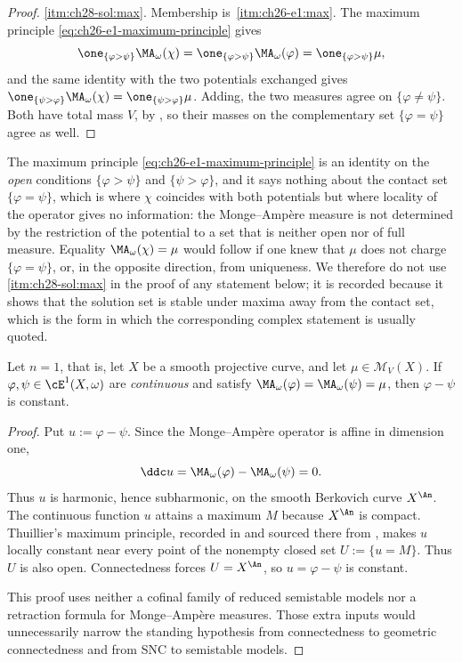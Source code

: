 \begin{proof}
\cref{itm:ch28-sol:max}.  Membership is
\,\cref{itm:ch26-e1:max}.  The maximum principle
\eqref{eq:ch26-e1-maximum-principle} gives
\[
 \one_{\{\varphi>\psi\}}\MA_\omega(\chi)
 =\one_{\{\varphi>\psi\}}\MA_\omega(\varphi)
 =\one_{\{\varphi>\psi\}}\mu ,
\]
and the same identity with the two potentials exchanged gives
$\one_{\{\psi>\varphi\}}\MA_\omega(\chi)
=\one_{\{\psi>\varphi\}}\mu$.  Adding, the two measures agree on
$\{\varphi\neq\psi\}$.  Both have total mass $V$, by
, so their masses on the complementary set
$\{\varphi=\psi\}$ agree as well.
\end{proof}

\begin{remark}
\label{rem:ch28-max-on-contact}
The maximum principle \eqref{eq:ch26-e1-maximum-principle} is an identity on
the \emph{open} conditions $\{\varphi>\psi\}$ and $\{\psi>\varphi\}$, and
it says nothing about the contact set $\{\varphi=\psi\}$, which is where
$\chi$ coincides with both potentials but where locality of the operator
gives no information: the Monge--Amp\`ere measure is not determined by the
restriction of the potential to a set that is neither open nor of full
measure.  Equality $\MA_\omega(\chi)=\mu$ would follow if one knew that
$\mu$ does not charge $\{\varphi=\psi\}$, or, in the opposite direction,
from uniqueness.  We therefore do not use \cref{itm:ch28-sol:max} in the proof
of any statement below; it is recorded because it shows that the solution set
is stable under maxima away from the contact set, which is the form in which
the corresponding complex statement is usually quoted.
\end{remark}

\begin{proposition}
\label{prop:ch28-curve-uniqueness}
Let $n=1$, that is, let $X$ be a smooth projective curve, and let
$\mu\in\mathcal M_V(X)$.  If $\varphi,\psi\in\cE^1(X,\omega)$ are
\emph{continuous} and satisfy
$\MA_\omega(\varphi)=\MA_\omega(\psi)=\mu$, then $\varphi-\psi$ is
constant.
\end{proposition}

\begin{proof}
Put $u:=\varphi-\psi$.  Since the Monge--Amp\`ere operator is affine in
dimension one,
\[
 \ddc u=\MA_\omega(\varphi)-\MA_\omega(\psi)=0.
\]
Thus $u$ is harmonic, hence subharmonic, on the smooth Berkovich curve
$X^{\An}$.  The continuous function $u$ attains a maximum $M$ because
$X^{\An}$ is compact.  Thuillier's maximum principle, recorded in
 and sourced there from
\cite[Proposition~3.1.11]{Thu05}, makes $u$ locally constant near every
point of the nonempty closed set $U:=\{u=M\}$.  Thus $U$ is also open.
Connectedness forces $U=X^{\An}$, so $u=\varphi-\psi$ is constant.

This proof uses neither a cofinal family of reduced semistable models nor a
retraction formula for Monge--Amp\`ere measures.  Those extra inputs would
unnecessarily narrow the standing hypothesis from connectedness to
geometric connectedness and from SNC to semistable models.
\end{proof}


